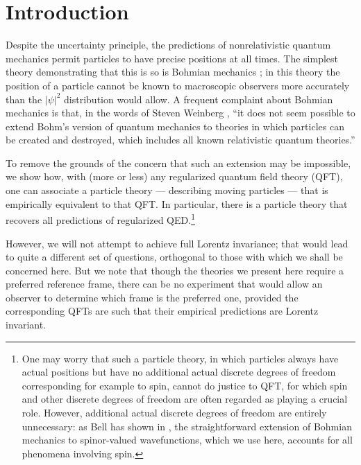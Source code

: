\documentclass[12pt, showpacs, nofootinbib,superscriptaddress]{revtex4-2}%
\begin{document}
\newpage

\section{Introduction}

Despite the uncertainty principle, the predictions
of nonrelativistic quantum mechanics permit particles to have precise
positions at all times.  The simplest theory demonstrating that this
is so is Bohmian mechanics \cite{Bohm52,Ischia,Stanford}; in this
theory the position of a particle cannot be known to macroscopic
observers more accurately than the $|\psi|^2$ distribution would
allow.  A frequent complaint about Bohmian mechanics is that, in the
words of Steven Weinberg \cite{weinlet}, ``it does not seem possible
to extend Bohm's version of quantum mechanics to theories in which
particles can be created and destroyed, which includes all known
relativistic quantum theories.''

To remove the grounds of the concern that such an extension may be
impossible, we show how, with (more or less) any regularized quantum
field theory (QFT), one can associate a particle theory --- describing
moving particles --- that is empirically equivalent to that QFT. In
particular, there is a particle theory that recovers all predictions
of regularized QED.\footnote{One may worry that such a particle theory, in which
particles always have actual positions but have no additional actual
discrete degrees of freedom corresponding for example to spin, cannot
do justice to QFT, for which spin and other discrete degrees of
freedom are often regarded as playing a crucial role. However,
additional actual discrete degrees of freedom are entirely
unnecessary: as Bell has shown in \cite{1966}, the straightforward
extension of Bohmian mechanics to spinor-valued wavefunctions, which
we use here, accounts for all phenomena involving spin.}

However, we will not attempt to achieve full Lorentz invariance; that
would lead to quite a different set of questions, orthogonal to those
with which we shall be concerned here. But we note that though the
theories we present here require a preferred reference frame, there
can be no experiment that would allow an observer to determine which
frame is the preferred one, provided the corresponding QFTs are such
that their empirical predictions are Lorentz invariant.
\end{document}
